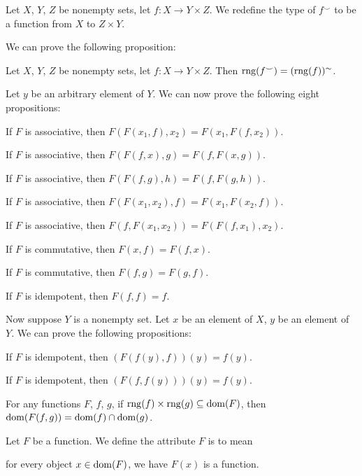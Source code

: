 \documentclass{article}
\begin{document}
\begin{definition}
Let $X$, $Y$, $Z$ be nonempty sets, let $f\colon X\to Y\times Z$.
We redefine the type of $f^{\smile}$ to be a function from $X$ to $Z\times Y$.
\end{definition}

We can prove the following proposition:
\begin{thm}
\item\label{funcop1:58} Let $X$, $Y$, $Z$ be nonempty sets, let $f\colon X\to Y\times Z$.
  Then $\operatorname{rng}(f^{\smile})=(\operatorname{rng}(f))^{\sim}$.
\end{thm}

Let $y$ be an arbitrary element of $Y$. We can now prove the following
eight propositions:
\begin{thm}
\item\label{funcop1:59} If $F$ is associative,
  then $F(F(x_{1},f),x_{2})=F(x_{1},F(f,x_{2}))$.
\item\label{funcop1:60} If $F$ is associative,
  then $F(F(f,x),g)=F(f,F(x,g))$.
\item\label{funcop1:61} If $F$ is associative,
  then $F(F(f,g),h)=F(f,F(g,h))$.
\item\label{funcop1:62} If $F$ is associative,
  then $F(F(x_{1},x_{2}),f)=F(x_{1},F(x_{2},f))$.
\item\label{funcop1:63} If $F$ is associative,
  then $F(f,F(x_{1},x_{2}))=F(F(f,x_{1}),x_{2})$.
\item\label{funcop1:64} If $F$ is commutative,
  then $F(x,f)=F(f,x)$.
\item\label{funcop1:65} If $F$ is commutative,
  then $F(f,g)=F(g,f)$.
\item\label{funcop1:66} If $F$ is idempotent,
  then $F(f,f)=f$.
\end{thm}

Now suppose $Y$ is a nonempty set. Let $x$ be an element of $X$, $y$ be
an element of $Y$. We can prove the following propositions:
\begin{thm}
\item\label{funcop1:67} If $F$ is idempotent,
  then $(F(f(y),f))(y)=f(y)$.
\item\label{funcop1:68} If $F$ is idempotent,
  then $(F(f,f(y)))(y)=f(y)$.
\item\label{funcop1:69} For any functions $F$, $f$, $g$,
  if $\operatorname{rng}(f)\times\operatorname{rng}(g)\subseteq\operatorname{dom}(F)$, then $\operatorname{dom}(F(f,g))=\operatorname{dom}(f)\cap\operatorname{dom}(g)$.
\end{thm}

\begin{definition}
Let $F$ be a function.
We define the attribute $F$ is  to mean
\begin{defn}
\item for every object $x\in\operatorname{dom}(F)$, we have $F(x)$ is a function.
\end{defn}
\end{definition}
\end{document}
